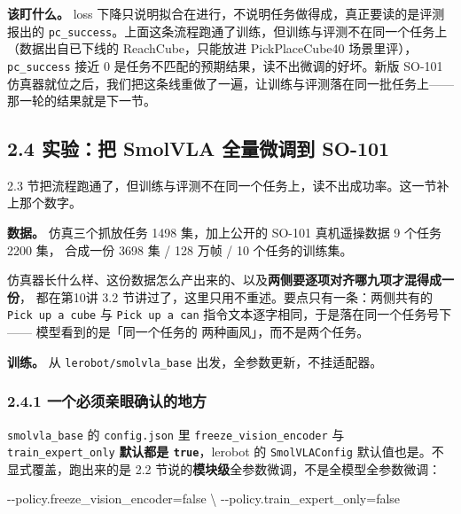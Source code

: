 \documentclass[
  chinese,
]{ctexart}
\newenvironment{Shaded}{\begin{snugshade}}{\end{snugshade}}
\newcommand{\DataTypeTok}[1]{\textcolor[rgb]{0.68,0.00,0.00}{#1}}
\newcommand{\ExtensionTok}[1]{\textcolor[rgb]{0.00,0.23,0.31}{#1}}
\newcommand{\NormalTok}[1]{\textcolor[rgb]{0.00,0.23,0.31}{#1}}
\begin{document}
\textbf{该盯什么。} loss
下降只说明拟合在进行，不说明任务做得成，真正要读的是评测报出的
\texttt{pc\_success}。上面这条流程跑通了训练，但训练与评测不在同一个任务上（数据出自已下线的
ReachCube，只能放进 PickPlaceCube40 场景里评），\texttt{pc\_success}
接近 0 是任务不匹配的预期结果，读不出微调的好坏。新版 SO-101
仿真器就位之后，我们把这条线重做了一遍，让训练与评测落在同一批任务上------那一轮的结果就是下一节。

\subsection{2.4 实验：把 SmolVLA 全量微调到
SO-101}\label{ux5b9eux9a8cux628a-smolvla-ux5168ux91cfux5faeux8c03ux5230-so-101}

2.3
节把流程跑通了，但训练与评测不在同一个任务上，读不出成功率。这一节补上那个数字。

\textbf{数据。} 仿真三个抓放任务 1498 集，加上公开的 SO-101 真机遥操数据
9 个任务 2200 集， 合成一份 3698 集 / 128 万帧 / 10 个任务的训练集。

仿真器长什么样、这份数据怎么产出来的、以及\textbf{两侧要逐项对齐哪九项才混得成一份}，
都在第10讲 3.2 节讲过了，这里只用不重述。要点只有一条：两侧共有的
\texttt{Pick\ up\ a\ cube} 与 \texttt{Pick\ up\ a\ can}
指令文本逐字相同，于是落在同一个任务号下 ------
模型看到的是「同一个任务的 两种画风」，而不是两个任务。

\textbf{训练。} 从 \texttt{lerobot/smolvla\_base}
出发，全参数更新，不挂适配器。

\subsubsection{2.4.1
一个必须亲眼确认的地方}\label{ux4e00ux4e2aux5fc5ux987bux4eb2ux773cux786eux8ba4ux7684ux5730ux65b9}

\texttt{smolvla\_base} 的 \texttt{config.json} 里
\texttt{freeze\_vision\_encoder} 与 \texttt{train\_expert\_only}
\textbf{默认都是 \texttt{true}}，lerobot 的 \texttt{SmolVLAConfig}
默认值也是。不显式覆盖，跑出来的是 2.2
节说的\textbf{模块级}全参数微调，不是全模型全参数微调：

\begin{Shaded}
\begin{Highlighting}[]
\ExtensionTok{{-}{-}policy.freeze\_vision\_encoder=false} \DataTypeTok{\textbackslash{}}
\NormalTok{{-}{-}policy.train\_expert\_only=false}
\end{Highlighting}
\end{Shaded}
\end{document}
